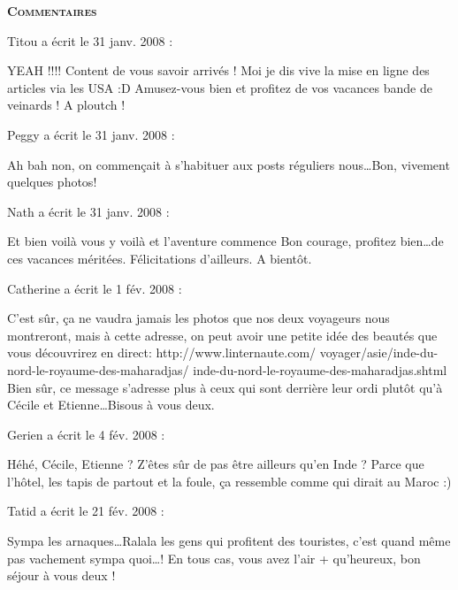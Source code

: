 \bigskip
\textbf{\textsc{Commentaires}}

\medskip
Titou a écrit le 31 janv. 2008 :
\begin{displayquote}
YEAH !!!!
Content de vous savoir arrivés ! Moi je dis vive la mise en ligne des articles via les USA :D Amusez-vous bien et profitez de vos vacances bande de veinards ! A ploutch !
\end{displayquote}

\medskip
Peggy a écrit le 31 janv. 2008 :
\begin{displayquote}
Ah bah non, on commençait à s'habituer aux posts réguliers nous\dots Bon, vivement quelques photos!
\end{displayquote}

\medskip
Nath a écrit le 31 janv. 2008 :
\begin{displayquote}
Et bien voilà vous y voilà  et l'aventure commence
Bon courage, profitez bien\dots de ces vacances méritées. Félicitations d'ailleurs.
A bientôt.
\end{displayquote}

\medskip
Catherine a écrit le 1 fév. 2008 :
\begin{displayquote}
C'est sûr, ça ne vaudra jamais les photos que nos deux voyageurs nous montreront, mais à cette adresse, on peut avoir une petite idée des beautés que vous découvrirez en direct: http://www.linternaute.com/
voyager/asie/inde-du-nord-le-royaume-des-maharadjas/
inde-du-nord-le-royaume-des-maharadjas.shtml
Bien sûr, ce message s'adresse plus à ceux qui sont derrière leur ordi plutôt qu'à Cécile et Etienne\dots Bisous à vous deux.
\end{displayquote}

\medskip
Gerien a écrit le 4 fév. 2008 :
\begin{displayquote}
Héhé,
Cécile, Etienne ? Z'êtes sûr de pas être ailleurs qu'en Inde ?
Parce que l'hôtel, les tapis de partout et la foule, ça ressemble comme qui dirait au Maroc :)
\end{displayquote}

\medskip
Tatid a écrit le 21 fév. 2008 :
\begin{displayquote}
Sympa les arnaques\dots Ralala les gens qui profitent des touristes, c'est quand même pas vachement sympa quoi\dots !
En tous cas, vous avez l'air + qu'heureux, bon séjour à vous deux !
\end{displayquote}

\vfill
